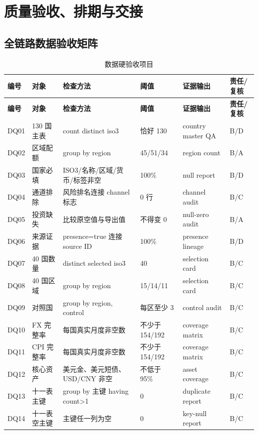\documentclass[UTF8,fontset=windows,12pt,openany]{ctexbook}
\begin{document}
\part{质量验收、排期与交接}

\clearpage
\begin{landscape}
\chapter{全链路数据验收矩阵}
\begin{longtable}{p{1.7cm}p{4.0cm}p{4.6cm}p{3.0cm}p{3.2cm}p{2.7cm}}
\caption{数据硬验收项目}\label{tab:data-acceptance}\\
\toprule
\textbf{编号} & \textbf{对象} & \textbf{检查方法} & \textbf{阈值} & \textbf{证据输出} & \textbf{责任/复核}\\
\midrule
\endfirsthead
\toprule \textbf{编号} & \textbf{对象} & \textbf{检查方法} & \textbf{阈值} & \textbf{证据输出} & \textbf{责任/复核}\\ \midrule
\endhead
DQ01 & 130 国主表 & count distinct iso3 & 恰好 130 & country master QA & B/D\\
DQ02 & 区域配额 & group by region & 45/51/34 & region count & B/A\\
DQ03 & 国家必填 & ISO3/名称/区域/货币/标签非空 & 100\% & null report & B/D\\
DQ04 & 通道排除 & 风险排名连接 channel 标志 & 0 行 & channel audit & B/C\\
DQ05 & 投资缺失 & 比较原空值与导出值 & 不得变 0 & null-zero audit & B/A\\
DQ06 & 来源证据 & presence=true 连接 source ID & 100\% & presence lineage & B/D\\
DQ07 & 40 国数量 & distinct selected iso3 & 40 & selection card & B/C\\
DQ08 & 40 国区域 & group by region & 15/14/11 & selection card & B/C\\
DQ09 & 对照国 & group by region, control & 每区至少 3 & control audit & B/C\\
DQ10 & FX 完整率 & 每国真实月度非空数 & 不少于 154/192 & coverage matrix & B/C\\
DQ11 & CPI 完整率 & 每国真实月度非空数 & 不少于 154/192 & coverage matrix & B/C\\
DQ12 & 核心资产 & 美元金、美元短债、USD/CNY 非空 & 不低于 95\% & asset coverage & B/C\\
DQ13 & 十一表主键 & group by 主键 having count>1 & 0 & duplicate report & B/C\\
DQ14 & 十一表空主键 & 主键任一列为空 & 0 & key-null report & B/C\\

\end{longtable}
\end{landscape}
\end{document}
